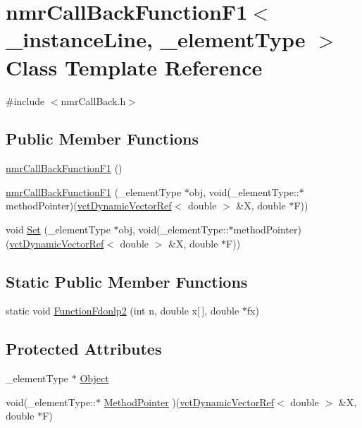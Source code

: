\hypertarget{classnmr_call_back_function_f1}{}\section{nmr\+Call\+Back\+Function\+F1$<$ \+\_\+instance\+Line, \+\_\+element\+Type $>$ Class Template Reference}
\label{classnmr_call_back_function_f1}


{\ttfamily \#include $<$nmr\+Call\+Back.\+h$>$}

\subsection*{Public Member Functions}
\begin{DoxyCompactItemize}
\item 
\hyperlink{classnmr_call_back_function_f1_ac4b710c1e9e0d39300dcaa57bbf64393}{nmr\+Call\+Back\+Function\+F1} ()
\item 
\hyperlink{classnmr_call_back_function_f1_ae2f443265d36a2e7f910ee18002dd43c}{nmr\+Call\+Back\+Function\+F1} (\+\_\+element\+Type $\ast$obj, void(\+\_\+element\+Type\+::$\ast$method\+Pointer)(\hyperlink{classvct_dynamic_vector_ref}{vct\+Dynamic\+Vector\+Ref}$<$ double $>$ \&X, double $\ast$F))
\item 
void \hyperlink{classnmr_call_back_function_f1_a293dd5822b1fd7c32d42a55133a180b5}{Set} (\+\_\+element\+Type $\ast$obj, void(\+\_\+element\+Type\+::$\ast$method\+Pointer)(\hyperlink{classvct_dynamic_vector_ref}{vct\+Dynamic\+Vector\+Ref}$<$ double $>$ \&X, double $\ast$F))
\end{DoxyCompactItemize}
\subsection*{Static Public Member Functions}
\begin{DoxyCompactItemize}
\item 
static void \hyperlink{classnmr_call_back_function_f1_a720235044e772004b44ae5baf496d28e}{Function\+Fdonlp2} (int n, double x\mbox{[}$\,$\mbox{]}, double $\ast$fx)
\end{DoxyCompactItemize}
\subsection*{Protected Attributes}
\begin{DoxyCompactItemize}
\item 
\+\_\+element\+Type $\ast$ \hyperlink{classnmr_call_back_function_f1_a65ebc32c3c8d280b0920dfbb27eb96d8}{Object}
\item 
void(\+\_\+element\+Type\+::$\ast$ \hyperlink{classnmr_call_back_function_f1_ab21956b8763a52d6e2b08a2ee0def382}{Method\+Pointer} )(\hyperlink{classvct_dynamic_vector_ref}{vct\+Dynamic\+Vector\+Ref}$<$ double $>$ \&X, double $\ast$F)
\end{DoxyCompactItemize}
